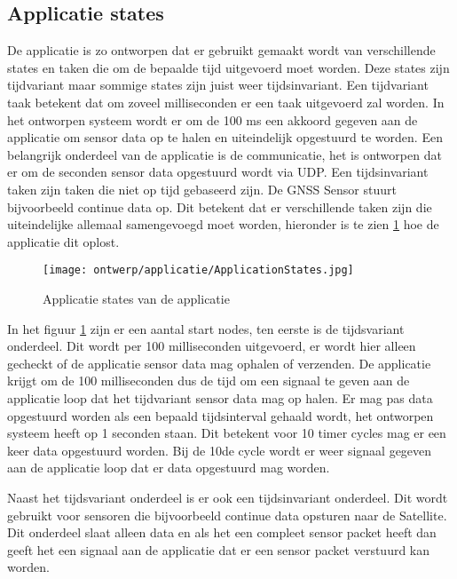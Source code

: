 \subsection{Applicatie states}
De applicatie is zo ontworpen dat er gebruikt gemaakt wordt van verschillende states en taken die om de bepaalde tijd uitgevoerd moet worden. Deze states zijn tijdvariant maar sommige states zijn juist weer tijdsinvariant. Een tijdvariant taak  betekent dat om zoveel milliseconden er een taak uitgevoerd zal worden. In het ontworpen systeem wordt er om de 100 ms een akkoord gegeven aan de applicatie om sensor data op te halen en uiteindelijk opgestuurd te worden. Een belangrijk onderdeel van de applicatie is de communicatie, het is ontworpen dat er om de seconden sensor data opgestuurd wordt via UDP. Een tijdsinvariant taken zijn taken die niet op tijd gebaseerd zijn. De GNSS Sensor stuurt bijvoorbeeld continue data op. Dit betekent dat er verschillende taken zijn die uiteindelijke allemaal samengevoegd moet worden, hieronder is te zien \ref{fig:appstates} hoe de applicatie dit oplost.

\begin{figure}[h!]
	\centering
	\label{fig:appstates}
	\caption{Applicatie states van de applicatie}
	\texttt{[image: ontwerp/applicatie/ApplicationStates.jpg]}
\end{figure}

\noindent In het figuur \ref{fig:appstates} zijn er een aantal start nodes, ten eerste is de tijdsvariant onderdeel. Dit wordt per 100 milliseconden uitgevoerd, er wordt hier alleen gecheckt of de applicatie sensor data mag ophalen of verzenden. De applicatie krijgt om de 100 milliseconden dus de tijd om een signaal te geven aan de applicatie loop dat het tijdvariant sensor data mag op halen. Er mag pas data opgestuurd worden als een bepaald tijdsinterval gehaald wordt, het ontworpen systeem heeft op 1 seconden staan. Dit betekent voor 10 timer cycles mag er een keer data opgestuurd worden. Bij de 10de cycle wordt er weer signaal gegeven aan de applicatie loop dat er data opgestuurd mag worden. \newline

\noindent Naast het tijdsvariant onderdeel is er ook een tijdsinvariant onderdeel. Dit wordt gebruikt voor sensoren die bijvoorbeeld continue data opsturen naar de Satellite. Dit onderdeel slaat alleen data en als het een compleet sensor packet heeft dan geeft het een signaal aan de applicatie dat er een sensor packet verstuurd kan worden. \newline

